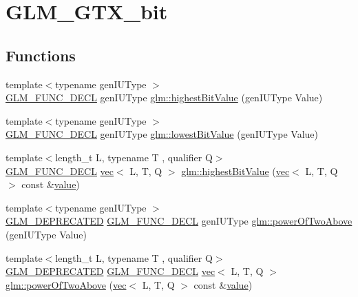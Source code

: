 \hypertarget{group__gtx__bit}{}\section{G\+L\+M\+\_\+\+G\+T\+X\+\_\+bit}
\label{group__gtx__bit}
\subsection*{Functions}
\begin{DoxyCompactItemize}
\item 
{\footnotesize template$<$typename gen\+I\+U\+Type $>$ }\\\mbox{\hyperlink{setup_8hpp_ab2d052de21a70539923e9bcbf6e83a51}{G\+L\+M\+\_\+\+F\+U\+N\+C\+\_\+\+D\+E\+CL}} gen\+I\+U\+Type \mbox{\hyperlink{group__gtx__bit_ga0dcc8fe7c3d3ad60dea409281efa3d05}{glm\+::highest\+Bit\+Value}} (gen\+I\+U\+Type Value)
\item 
{\footnotesize template$<$typename gen\+I\+U\+Type $>$ }\\\mbox{\hyperlink{setup_8hpp_ab2d052de21a70539923e9bcbf6e83a51}{G\+L\+M\+\_\+\+F\+U\+N\+C\+\_\+\+D\+E\+CL}} gen\+I\+U\+Type \mbox{\hyperlink{group__gtx__bit_ga2ff6568089f3a9b67f5c30918855fc6f}{glm\+::lowest\+Bit\+Value}} (gen\+I\+U\+Type Value)
\item 
{\footnotesize template$<$length\+\_\+t L, typename T , qualifier Q$>$ }\\\mbox{\hyperlink{setup_8hpp_ab2d052de21a70539923e9bcbf6e83a51}{G\+L\+M\+\_\+\+F\+U\+N\+C\+\_\+\+D\+E\+CL}} \mbox{\hyperlink{structglm_1_1vec}{vec}}$<$ L, T, Q $>$ \mbox{\hyperlink{group__gtx__bit_ga898ef075ccf809a1e480faab48fe96bf}{glm\+::highest\+Bit\+Value}} (\mbox{\hyperlink{structglm_1_1vec}{vec}}$<$ L, T, Q $>$ const \&\mbox{\hyperlink{_s_d_l__opengl__glext_8h_a8ad81492d410ff2ac11f754f4042150f}{value}})
\item 
{\footnotesize template$<$typename gen\+I\+U\+Type $>$ }\\\mbox{\hyperlink{setup_8hpp_a8edfb48cdc249a3ee48406bf179023dc}{G\+L\+M\+\_\+\+D\+E\+P\+R\+E\+C\+A\+T\+ED}} \mbox{\hyperlink{setup_8hpp_ab2d052de21a70539923e9bcbf6e83a51}{G\+L\+M\+\_\+\+F\+U\+N\+C\+\_\+\+D\+E\+CL}} gen\+I\+U\+Type \mbox{\hyperlink{group__gtx__bit_ga8cda2459871f574a0aecbe702ac93291}{glm\+::power\+Of\+Two\+Above}} (gen\+I\+U\+Type Value)
\item 
{\footnotesize template$<$length\+\_\+t L, typename T , qualifier Q$>$ }\\\mbox{\hyperlink{setup_8hpp_a8edfb48cdc249a3ee48406bf179023dc}{G\+L\+M\+\_\+\+D\+E\+P\+R\+E\+C\+A\+T\+ED}} \mbox{\hyperlink{setup_8hpp_ab2d052de21a70539923e9bcbf6e83a51}{G\+L\+M\+\_\+\+F\+U\+N\+C\+\_\+\+D\+E\+CL}} \mbox{\hyperlink{structglm_1_1vec}{vec}}$<$ L, T, Q $>$ \mbox{\hyperlink{group__gtx__bit_ga2bbded187c5febfefc1e524ba31b3fab}{glm\+::power\+Of\+Two\+Above}} (\mbox{\hyperlink{structglm_1_1vec}{vec}}$<$ L, T, Q $>$ const \&\mbox{\hyperlink{_s_d_l__opengl__glext_8h_a8ad81492d410ff2ac11f754f4042150f}{value}})

\end{DoxyCompactItemize}
